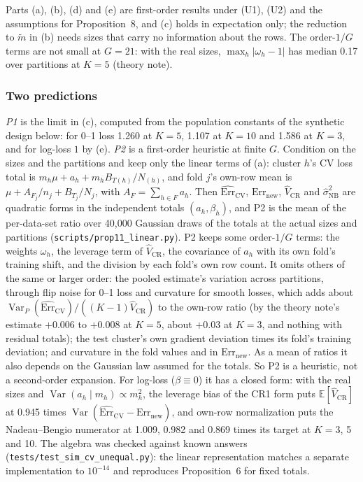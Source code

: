 \documentclass[11pt]{amsart}
\theoremstyle{plain}
\theoremstyle{definition}
\theoremstyle{remark}
\newcommand{\Var}{\operatorname{Var}}
\newcommand{\E}{\mathbb{E}}
\newcommand{\CV}{\widehat{\mathrm{Err}}_{\mathrm{CV}}}
\newcommand{\Errnew}{\mathrm{Err}_{\mathrm{new}}}
\newcommand{\VCR}{\hat V_{\mathrm{CR}}}
\newcommand{\VNB}{\hat\sigma^2_{\mathrm{NB}}}
\begin{document}
Parts (a), (b), (d) and (e) are first-order results under (U1), (U2) and the assumptions for Proposition~8, and (c) holds in expectation only; the reduction to $\tilde m$ in (b) needs sizes that carry no information about the rows. The order-$1/G$ terms are not small at $G=21$: with the real sizes, $\max_h|\omega_h-1|$ has median 0.17 over partitions at $K=5$ (theory note).

\subsubsection*{Two predictions} \emph{P1} is the limit in (c), computed from the population constants of the synthetic design below: for 0--1 loss 1.260 at $K=5$, 1.107 at $K=10$ and 1.586 at $K=3$, and for log-loss $1$ by (e). \emph{P2} is a first-order heuristic at finite $G$. Condition on the sizes and the partitions and keep only the linear terms of (a): cluster $h$'s CV loss total is $m_h\mu+a_h+m_hB_{T(h)}/N_{(h)}$, and fold $j$'s own-row mean is $\mu+A_{F_j}/n_j+B_{T_j}/N_j$, with $A_F=\sum_{h\in F}a_h$. Then $\CV$, $\Errnew$, $\VCR$ and $\VNB$ are quadratic forms in the independent totals $(a_h,\beta_h)$, and P2 is the mean of the per-data-set ratio over 40,000 Gaussian draws of the totals at the actual sizes and partitions (\texttt{scripts/prop11\_linear.py}). P2 keeps some order-$1/G$ terms: the weights $\omega_h$, the leverage term of $\VCR$, the covariance of $a_h$ with its own fold's training shift, and the division by each fold's own row count. It omits others of the same or larger order: the pooled estimate's variation across partitions, through flip noise for 0--1 loss and curvature for smooth losses, which adds about $\Var_P(\CV)/((K-1)\VCR)$ to the own-row ratio (by the theory note's estimate $+0.006$ to $+0.008$ at $K=5$, about $+0.03$ at $K=3$, and nothing with residual totals); the test cluster's own gradient deviation times its fold's training deviation; and curvature in the fold values and in $\Errnew$. As a mean of ratios it also depends on the Gaussian law assumed for the totals. So P2 is a heuristic, not a second-order expansion. For log-loss ($\beta\equiv0$) it has a closed form: with the real sizes and $\Var(a_h\mid m_h)\propto m_h^2$, the leverage bias of the CR1 form puts $\E[\VCR]$ at 0.945 times $\Var(\CV-\Errnew)$, and own-row normalization puts the Nadeau--Bengio numerator at 1.009, 0.982 and 0.869 times its target at $K=3$, 5 and 10. The algebra was checked against known answers (\texttt{tests/test\_sim\_cv\_unequal.py}): the linear representation matches a separate implementation to $10^{-14}$ and reproduces Proposition~6 for fixed totals.
\end{document}
